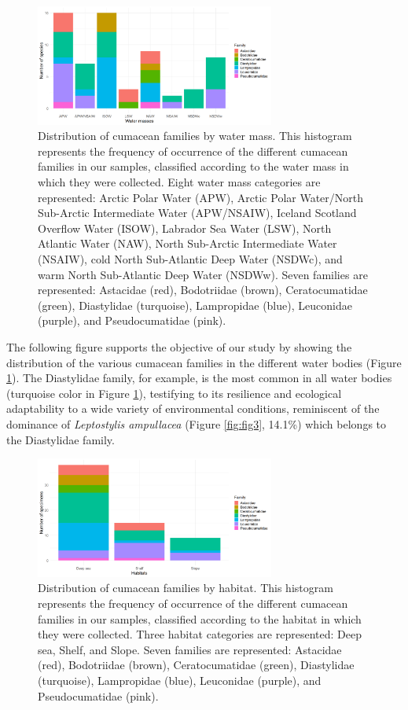 \begin{figure}[htbp]
    \centering
    \includegraphics[width=0.7\textwidth]{figure3.png}
    \caption{Distribution of cumacean families by water mass. This histogram represents the frequency of occurrence of the different cumacean families in our samples, classified according to the water mass in which they were collected. Eight water mass categories are represented: Arctic Polar Water (APW), Arctic Polar Water/North Sub-Arctic Intermediate Water (APW/NSAIW), Iceland Scotland Overflow Water (ISOW), Labrador Sea Water (LSW), North Atlantic Water (NAW), North Sub-Arctic Intermediate Water (NSAIW), cold North Sub-Atlantic Deep Water (NSDWc), and warm North Sub-Atlantic Deep Water (NSDWw). Seven families are represented: Astacidae (red), Bodotriidae (brown), Ceratocumatidae (green), Diastylidae (turquoise), Lampropidae (blue), Leuconidae (purple), and Pseudocumatidae (pink). \label{fig:fig4}}
\end{figure}

The following figure supports the objective of our study by showing the distribution of the various cumacean families in the different water bodies (Figure \ref{fig:fig4}). The Diastylidae family, for example, is the most common in all water bodies (turquoise color in Figure \ref{fig:fig4}), testifying to its resilience and ecological adaptability to a wide variety of environmental conditions, reminiscent of the dominance of \emph{Leptostylis ampullacea} (Figure \ref{fig:fig3}, 14.1\%) which belongs to the Diastylidae family. 

\begin{figure}[]
    \centering
    \includegraphics[width=0.7\textwidth]{figure4.png}
    \caption{Distribution of cumacean families by habitat. This histogram represents the frequency of occurrence of the different cumacean families in our samples, classified according to the habitat in which they were collected. Three habitat categories are represented: Deep sea, Shelf, and Slope. Seven families are represented: Astacidae (red), Bodotriidae (brown), Ceratocumatidae (green), Diastylidae (turquoise), Lampropidae (blue), Leuconidae (purple), and Pseudocumatidae (pink). \label{fig:fig5}}
\end{figure}

